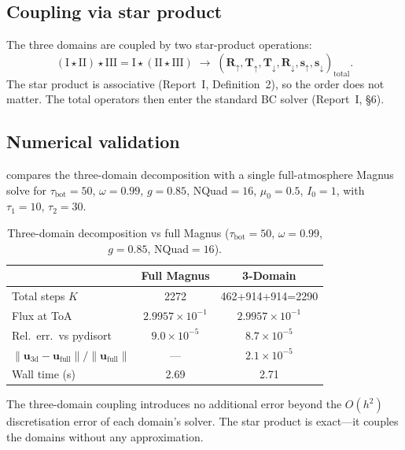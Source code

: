 \documentclass[11pt,a4paper]{article}
\newcommand{\vect}[1]{\bm{#1}}
\newcommand{\mat}[1]{\mathbf{#1}}
\newcommand{\tbot}{\tau_{\mathrm{bot}}}
\theoremstyle{definition}
\begin{document}
\subsection{Coupling via star product}

The three domains are coupled by two star-product operations:
\begin{equation}
  (\text{I}\star\text{II})\star\text{III}
  = \text{I}\star(\text{II}\star\text{III})
  \;\longrightarrow\;
  (\mat{R}_\uparrow,\mat{T}_\uparrow,\mat{T}_\downarrow,\mat{R}_\downarrow,\vect{s}_\uparrow,\vect{s}_\downarrow)_{\text{total}}.
\end{equation}
The star product is associative (Report~I, Definition~2),
so the order does not matter.  The total operators then enter the
standard BC solver (Report~I, \S6).

\subsection{Numerical validation}

 compares the three-domain decomposition with a
single full-atmosphere Magnus solve for $\tbot=50$, $\omega=0.99$,
$g=0.85$, NQuad${}=16$, $\mu_0=0.5$, $I_0=1$, with $\tau_1=10$,
$\tau_2=30$.

\begin{table}[h]\centering
\caption{Three-domain decomposition vs full Magnus
($\tbot=50$, $\omega=0.99$, $g=0.85$, NQuad${}=16$).}
\label{tab:3domain}
\begin{tabular}{lcc}
\toprule
& Full Magnus & 3-Domain \\
\midrule
Total steps $K$ & 2272 & 462+914+914=2290 \\
Flux at ToA & $2.9957\times 10^{-1}$ & $2.9957\times 10^{-1}$ \\
Rel.\ err.\ vs pydisort & $9.0\times 10^{-5}$ & $8.7\times 10^{-5}$ \\
$\|\vect{u}_{\text{3d}}-\vect{u}_{\text{full}}\|/\|\vect{u}_{\text{full}}\|$ & --- & $2.1\times 10^{-5}$ \\
Wall time (s) & 2.69 & 2.71 \\
\bottomrule
\end{tabular}
\end{table}

The three-domain coupling introduces no additional error beyond the
$O(h^2)$ discretisation error of each domain's solver.  The star
product is exact---it couples the domains without any approximation.
\end{document}
